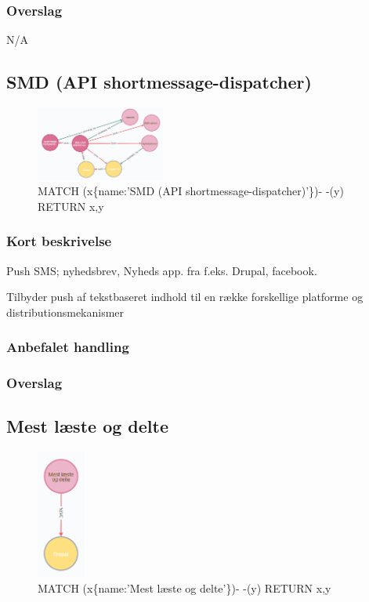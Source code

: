 \documentclass{article}
\begin{document}
\subsubsection{Overslag}
N/A

\subsection{SMD (API shortmessage-dispatcher)}
\begin{figure}[h]
\includegraphics[width=120pt]{SMD.PNG}
\caption{MATCH (x\{name:'SMD (API shortmessage-dispatcher)'\})- -(y) RETURN x,y}
\end{figure}
\subsubsection{Kort beskrivelse}
Push SMS; nyhedsbrev, Nyheds app. fra f.eks. Drupal, facebook.

Tilbyder push af tekstbaseret indhold til en række forskellige platforme og distributionsmekanismer
\subsubsection{Anbefalet handling}
\subsubsection{Overslag}


\subsection{Mest læste og delte}
\begin{figure}[h]
\includegraphics[height=120pt]{MestL.PNG}
\caption{MATCH (x\{name:'Mest læste og delte'\})- -(y) RETURN x,y}
\end{figure}
\end{document}
